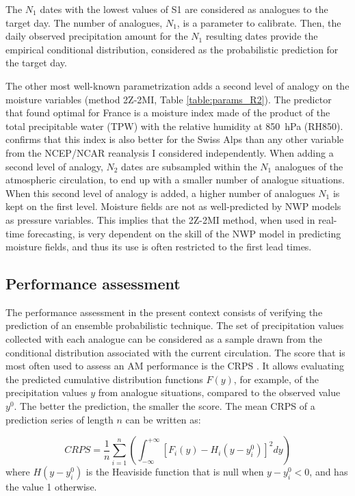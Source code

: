\documentclass[review]{elsarticle}
\begin{document}
The $N_{1}$ dates with the lowest values of S1 are considered as analogues to the target day. The number of analogues, $N_{1}$, is a parameter to calibrate. Then, the daily observed precipitation amount for the $N_{1}$ resulting dates provide the empirical conditional distribution, considered as the probabilistic prediction for the target day.

The other most well-known parametrization adds a second level of analogy on the moisture variables (method 2Z-2MI, Table \ref{table:params_R2}). The predictor that \citet{Bontron2004} found optimal for France is a moisture index made of the product of the total precipitable water (TPW) with the relative humidity at 850~hPa (RH850). \cite{Horton2012a} confirms that this index is also better for the Swiss Alps than any other variable from the NCEP/NCAR reanalysis I considered independently. When adding a second level of analogy, $N_{2}$ dates are subsampled within the $N_{1}$ analogues of the atmospheric circulation, to end up with a smaller number of analogue situations. When this second level of analogy is added, a higher number of analogues $N_{1}$ is kept on the first level. Moisture fields are not as well-predicted by NWP models as pressure variables. This implies that the 2Z-2MI method, when used in real-time forecasting, is very dependent on the skill of the NWP model in predicting moisture fields, and thus its use is often restricted to the first lead times.


\subsection{Performance assessment}
\label{sec:score}

The performance assessment in the present context consists of verifying the prediction of an ensemble probabilistic technique. The set of precipitation values collected with each analogue can be considered as a sample drawn from the conditional distribution associated with the current circulation. The score that is most often used to assess an AM performance is the CRPS \citep[Continuous Ranked Probability Score,][]{Brown1974, Matheson1976, Hersbach2000}. It allows evaluating the predicted cumulative distribution functions $F(y)$, for example, of the precipitation values $y$ from analogue situations, compared to the observed value $y^{0}$. The better the prediction, the smaller the score. The mean CRPS of a prediction series of length $n$ can be written as:

\begin{equation}
\label{eq:CRPS}
CRPS = \frac{1}{n} \sum_{i=1}^{n} \left(  \int_{-\infty}^{+\infty} \left[ F_{i}(y)-H_{i}(y-y_{i}^{0})\right]^{2} dy \right) 
\end{equation}
where $H(y-y_{i}^{0})$ is the Heaviside function that is null when $y-y_{i}^{0}<0$, and has the value 1 otherwise.
\end{document}
